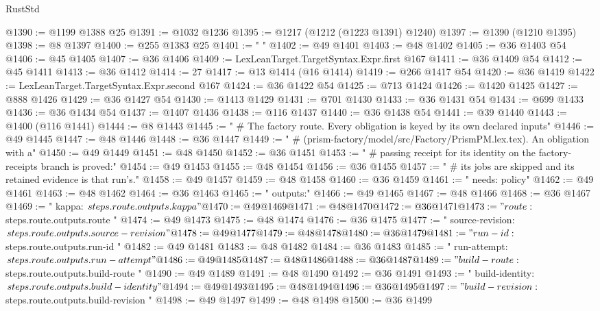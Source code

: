 \begin{lexlean}{RustStd}
\begin{coremodule}
@1390 := @1199 @1388 @25
@1391 := @1032 @1236
@1395 := @1217 (@1212 (@1223 @1391) @1240)
@1397 := @1390 (@1210 @1395)
@1398 := @8 @1397
@1400 := @255 @1383 @25
@1401 := "            "
@1402 := @49 @1401
@1403 := @48 @1402
@1405 := @36 @1403 @54
@1406 := @45 @1405
@1407 := @36 @1406
@1409 := LexLeanTarget.TargetSyntax.Expr.first @167
@1411 := @36 @1409 @54
@1412 := @45 @1411
@1413 := @36 @1412
@1414 := 27
@1417 := @13 @1414 (@16 @1414)
@1419 := @266 @1417 @54
@1420 := @36 @1419
@1422 := LexLeanTarget.TargetSyntax.Expr.second @167
@1424 := @36 @1422 @54
@1425 := @713 @1424
@1426 := @1420 @1425
@1427 := @888 @1426
@1429 := @36 @1427 @54
@1430 := @1413 @1429
@1431 := @701 @1430
@1433 := @36 @1431 @54
@1434 := @699 @1433
@1436 := @36 @1434 @54
@1437 := @1407 @1436
@1438 := @116 @1437
@1440 := @36 @1438 @54
@1441 := @39 @1440
@1443 := @1400 (@116 @1441)
@1444 := @8 @1443
@1445 := "  # The factory route. Every obligation is keyed by its own declared inputs"
@1446 := @49 @1445
@1447 := @48 @1446
@1448 := @36 @1447
@1449 := "  # (prism-factory/model/src/Factory/PrismPM.lex.tex). An obligation with a"
@1450 := @49 @1449
@1451 := @48 @1450
@1452 := @36 @1451
@1453 := "  # passing receipt for its identity on the factory-receipts branch is proved:"
@1454 := @49 @1453
@1455 := @48 @1454
@1456 := @36 @1455
@1457 := "  # its jobs are skipped and its retained evidence is that run's."
@1458 := @49 @1457
@1459 := @48 @1458
@1460 := @36 @1459
@1461 := "    needs: policy"
@1462 := @49 @1461
@1463 := @48 @1462
@1464 := @36 @1463
@1465 := "    outputs:"
@1466 := @49 @1465
@1467 := @48 @1466
@1468 := @36 @1467
@1469 := "      kappa: ${{ steps.route.outputs.kappa }}"
@1470 := @49 @1469
@1471 := @48 @1470
@1472 := @36 @1471
@1473 := "      route: ${{ steps.route.outputs.route }}"
@1474 := @49 @1473
@1475 := @48 @1474
@1476 := @36 @1475
@1477 := "      source-revision: ${{ steps.route.outputs.source-revision }}"
@1478 := @49 @1477
@1479 := @48 @1478
@1480 := @36 @1479
@1481 := "      run-id: ${{ steps.route.outputs.run-id }}"
@1482 := @49 @1481
@1483 := @48 @1482
@1484 := @36 @1483
@1485 := "      run-attempt: ${{ steps.route.outputs.run-attempt }}"
@1486 := @49 @1485
@1487 := @48 @1486
@1488 := @36 @1487
@1489 := "      build-route: ${{ steps.route.outputs.build-route }}"
@1490 := @49 @1489
@1491 := @48 @1490
@1492 := @36 @1491
@1493 := "      build-identity: ${{ steps.route.outputs.build-identity }}"
@1494 := @49 @1493
@1495 := @48 @1494
@1496 := @36 @1495
@1497 := "      build-revision: ${{ steps.route.outputs.build-revision }}"
@1498 := @49 @1497
@1499 := @48 @1498
@1500 := @36 @1499

\end{coremodule}
\end{lexlean}
